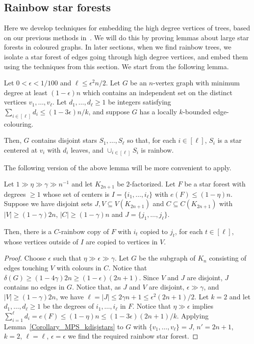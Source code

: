 \subsection{Rainbow star forests}\label{Section_stars}
Here we develop techniques for embedding the high degree vertices of trees, based on our previous methods in~\cite{MPS}. We will do this by proving lemmas about large star forests in coloured graphs. In later sections, when we find rainbow trees, we isolate a star forest of edges going through high degree vertices,  and embed them using the techniques from this section.
We start from the following lemma.

\begin{lemma}\label{Corollary_MPS_kdisjstars} Let $0<\epsilon<1/100$ and  $\ell\leq \epsilon^{2}n/2$. Let $G$ be an $n$-vertex graph with minimum degree at least $(1-\epsilon)n$  which contains an independent set on the distinct vertices $v_1,\ldots,v_\ell$.  Let $d_1,\ldots,d_\ell\geq 1$ be integers satisfying $\sum_{i\in [\ell]}d_i\leq (1-3\epsilon)n/k$,
and suppose $G$ has a locally $k$-bounded edge-colouring.

 Then, $G$ contains disjoint stars $S_1,\ldots,S_\ell$ so that, for each $i\in [\ell]$, $S_i$ is a star centered at $v_i$ with $d_i$ leaves, and $\cup_{i\in [\ell]}S_i$ is rainbow.
\end{lemma}

The following version of the above lemma will be more convenient to apply.
\begin{lemma}\label{Lemma_star_forest}
Let $1\gg \eta \gg\gamma\gg n^{-1}$ and let  $K_{2n+1}$ be $2$-factorized.
Let $F$ be a star forest with degrees $\geq 1$ whose set of centers is $I=\{i_1, \dots, i_{\ell}\}$ with $e(F)\leq (1-\eta)n$. Suppose we have disjoint sets $J, V\subseteq V(K_{2n+1})$ and $C\subseteq C(K_{2n+1})$ with $|V|\geq (1-\gamma)2n$, $|C|\geq (1-\gamma)n$ and  $J=\{j_1, \dots, j_{\ell}\}$.

Then, there is a $C$-rainbow copy of $F$ with $i_t$ copied to $j_t$, for each $t\in [\ell]$, whose vertices outside of $I$ are copied to vertices in $V$.
\end{lemma}
\begin{proof}
Choose $\epsilon$ such that $\eta \gg \epsilon\gg\gamma$.
Let $G$ be the subgraph of $K_n$ consisting of edges touching $V$ with colours in $C$. Notice that $\delta(G)\geq (1-4\gamma)2n\geq (1-\epsilon)(2n+1)$. Since $V$ and $J$ are disjoint, $J$ contains no edges in $G$. Notice that,  as $J$ and $V$ are disjoint, $\epsilon\gg \gamma$, and $|V|\geq (1-\gamma)2n$, we have $\ell=|J|\leq 2\gamma n+1\leq \epsilon^2 (2n+1)/2$. Let $k=2$ and let $d_1, \dots, d_{\ell}\geq 1$ be the degrees of $i_1,\ldots,i_\ell$ in $F$. Notice that $\eta \gg\epsilon$ implies $\sum_{i=1}^{\ell}d_i=e(F)\leq  (1-\eta)n\leq (1-3\epsilon)(2n+1)/k$.
Applying Lemma~\ref{Corollary_MPS_kdisjstars} to $G$ with $\{v_1, \dots, v_{\ell}\}=J$, $n'=2n+1$, $k=2$,  $\ell=\ell$, $\epsilon=\epsilon$  we find the required rainbow star forest.
\end{proof}

